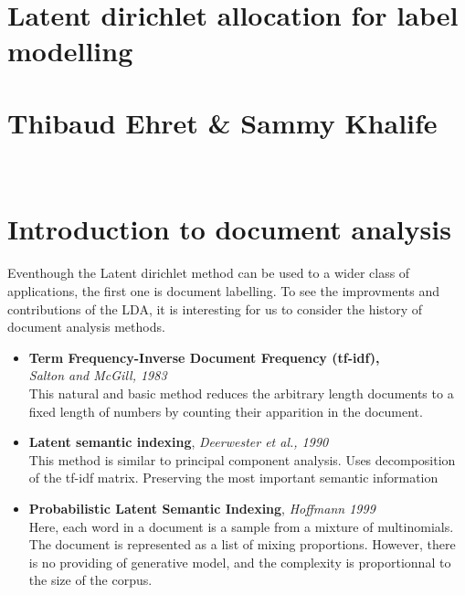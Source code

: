 \documentclass[12pt]{article}
\begin{document}
\begin{center}
\section*{Latent dirichlet allocation for label modelling}
\section*{Thibaud Ehret \& Sammy Khalife}
\end{center}
~\\
\section*{Introduction to document analysis}
Eventhough the Latent dirichlet method can be used to a wider class of applications, the first one is document labelling. To see the improvments and contributions of the LDA, it is interesting for us to consider the history of document analysis methods.
\begin{itemize}
\item \textbf{Term Frequency-Inverse Document Frequency (tf-idf),}~\\ \textit{Salton and McGill, 1983}~\\
This natural and basic method reduces the arbitrary length documents to a fixed length of numbers by counting their apparition in the document.~\\
\item \textbf{Latent semantic indexing}, \textit{Deerwester et al., 1990}~\\
This method is similar to principal component analysis. Uses decomposition of the tf-idf matrix. Preserving the most important semantic information~\\
\item \textbf{Probabilistic Latent Semantic Indexing}, \textit{Hoffmann 1999}~\\
Here, each word in a document is a sample from a mixture of multinomials. The document is represented as a list of mixing proportions. However, there is no providing of generative model, and the complexity is proportionnal to the size of the corpus.
\end{itemize}
\end{document}
